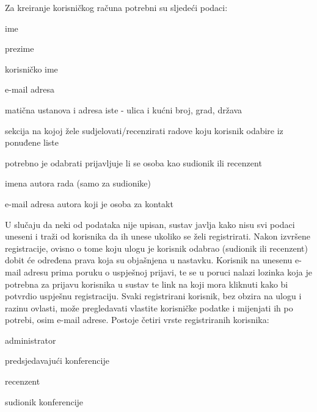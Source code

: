 		\newline
		\newline
		Za kreiranje korisničkog računa potrebni su sljedeći podaci:

		\begin{packed_item}

			\item ime
			\item prezime
			\item korisničko ime
			\item e-mail adresa
			\item matična ustanova i adresa iste - ulica i kućni broj, grad, država
			\item sekcija na kojoj žele sudjelovati/recenzirati radove koju korisnik odabire iz ponuđene liste
			\item potrebno je odabrati prijavljuje li se osoba kao sudionik ili recenzent
			\item imena autora rada (samo za sudionike)
			\item e-mail adresa autora koji je osoba za kontakt
		
		\end{packed_item}
	
		U slučaju da neki od podataka nije upisan, sustav javlja kako nisu svi podaci uneseni i traži od korisnika da ih unese ukoliko se želi registrirati. Nakon izvršene registracije, ovisno o tome koju ulogu je korisnik odabrao (sudionik ili recenzent) dobit će određena prava koja su objašnjena u nastavku. Korisnik na unesenu e-mail adresu prima poruku o uspješnoj prijavi, te se u poruci nalazi lozinka koja je potrebna za prijavu korisnika u sustav te link na koji mora kliknuti kako bi potvrdio uspješnu registraciju.
		\newline
		\newline
		Svaki registrirani korisnik, bez obzira na ulogu i razinu ovlasti, može pregledavati vlastite korisničke podatke i mijenjati ih po potrebi, osim e-mail adrese. 
		\newline
		\newline
		Postoje četiri vrste registriranih korisnika:
		
		\begin{packed_item}
			
			\item administrator
			\item predsjedavajući konferencije
			\item recenzent
			\item sudionik konferencije
			
		\end{packed_item}
	
